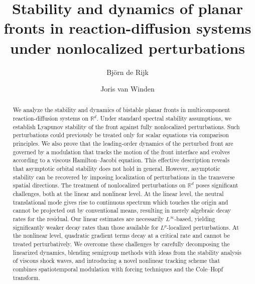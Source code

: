 \documentclass[12pt,oneside,a4paper,reqno]{amsart}
\title{Stability and dynamics of planar fronts in reaction-diffusion systems under nonlocalized perturbations}
\author{Bj\"orn de Rijk}
\author{Joris van Winden}
\numberwithin{equation}{section}
\theoremstyle{definition}
\theoremstyle{remark}
\newcommand{\bbR}{{\mathbb R}}
\begin{document}
\setcounter{page}{1} 

\begin{abstract}
We analyze the stability and dynamics of bistable planar fronts in multicomponent reaction-diffusion systems on $\bbR^{d}$.
Under standard spectral stability assumptions, we establish Lyapunov stability of the front against fully nonlocalized perturbations. Such perturbations could previously be treated only for scalar equations via comparison principles.
We also prove that the leading-order dynamics of the perturbed front are governed by a modulation that tracks the motion of the front interface and evolves according to a viscous Hamilton--Jacobi equation.
This effective description reveals that asymptotic orbital stability does not hold in general. However, asymptotic stability can be recovered by imposing localization of  perturbations in the transverse spatial directions.
The treatment of nonlocalized perturbations on $\bbR^{d}$ poses significant challenges, both at the linear and nonlinear level.
At the linear level, the neutral translational mode gives rise to continuous spectrum which touches the origin and cannot be projected out by conventional means, resulting in merely algebraic decay rates for the residual. Our linear estimates are necessarily $L^{\infty}$-based, yielding significantly weaker decay rates than those available for $L^p$-localized perturbations.
At the nonlinear level, quadratic gradient terms decay at a critical rate and cannot be treated perturbatively.
We overcome these challenges by carefully decomposing the linearized dynamics,
blending semigroup methods with ideas from the stability analysis of viscous shock waves, and introducing a novel nonlinear tracking scheme that combines spatiotemporal modulation with forcing techniques and the Cole--Hopf transform.
\end{abstract}



\maketitle
\end{document}
